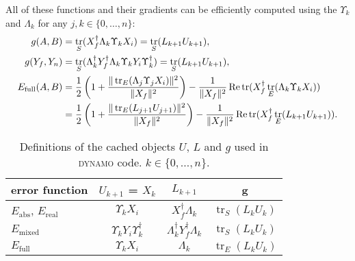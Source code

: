 \documentclass[aps, pra, a4paper, longbibliography, superscriptaddress]{revtex4-1}
\DeclareMathOperator{\tr}{tr}
\DeclareMathOperator{\re}{Re}
\newcommand{\spr}{\Upsilon}
\newcommand{\DYNAMO}{\textsc{dynamo}}
\begin{document}
All of these functions and their gradients can be efficiently computed
using the $\spr_k$ and $\Lambda_k$
for any $j, k \in \{0, \ldots, n\}$:
\begin{align}
g(A, B) &= \tr_S(X_f^\dagger \Lambda_k \spr_k X_i)
= \tr_S(L_{k+1} U_{k+1}),\\
g(Y_f, Y_n) &= \tr_S(\Lambda_k^\dagger Y_f^\dagger \Lambda_k \spr_k Y_i \spr_k^\dagger)
= \tr_S(L_{k+1} U_{k+1}),\\
\notag
E_\text{full}(A, B) &= \frac{1}{2}\left(1 +\frac{\|\tr_E(\Lambda_j \spr_j X_i)\|^2}{\|X_f\|^2}\right)
-\frac{1}{\|X_f\|^2} \re \tr(X_f^\dagger \tr_E(\Lambda_k \spr_k X_i))\\
&= \frac{1}{2}\left(1 +\frac{\|\tr_E(L_{j+1} U_{j+1})\|^2}{\|X_f\|^2}\right)
-\frac{1}{\|X_f\|^2} \re \tr(X_f^\dagger \tr_E(L_{k+1} U_{k+1})).
\end{align}

\begin{table}
\begin{tabular}{l|c|c|c}
error function & $U_{k+1}$ = $X_k$ & $L_{k+1}$ & g\\
\hline
$E_\text{abs}$, $E_\text{real}$ & $\spr_k X_i$ & $X_f^\dagger \Lambda_k$ & $\tr_S(L_k U_k)$\\
$E_\text{mixed}$ & $\spr_k Y_i \spr_k^\dagger$ & $\Lambda_k^\dagger Y_f^\dagger \Lambda_k$ & $\tr_S(L_k U_k)$\\
$E_\text{full}$ & $\spr_k X_i$ & $\Lambda_k$ & $\tr_E(L_k U_k)$
\end{tabular}
\caption{Definitions of the cached objects $U$, $L$ and $g$ used in \DYNAMO{}
  code. $k \in \{0, \ldots, n\}$.}
\label{table:UL}
\end{table}
\end{document}
